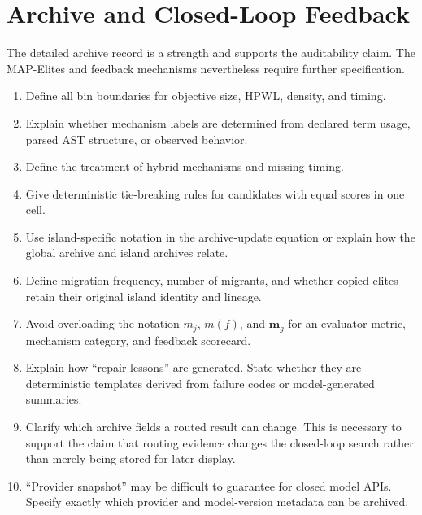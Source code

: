 \documentclass[11pt]{article}
\begin{document}
\section{Archive and Closed-Loop Feedback}

The detailed archive record is a strength and supports the auditability claim.
The MAP-Elites and feedback mechanisms nevertheless require further
specification.

\begin{enumerate}
  \item Define all bin boundaries for objective size, HPWL, density, and timing.

  \item Explain whether mechanism labels are determined from declared term
  usage, parsed AST structure, or observed behavior.

  \item Define the treatment of hybrid mechanisms and missing timing.

  \item Give deterministic tie-breaking rules for candidates with equal scores
  in one cell.

  \item Use island-specific notation in the archive-update equation or explain
  how the global archive and island archives relate.

  \item Define migration frequency, number of migrants, and whether copied
  elites retain their original island identity and lineage.

  \item Avoid overloading the notation $m_j$, $m(f)$, and $\mathbf m_g$ for an
  evaluator metric, mechanism category, and feedback scorecard.

  \item Explain how ``repair lessons'' are generated. State whether they are
  deterministic templates derived from failure codes or model-generated
  summaries.

  \item Clarify which archive fields a routed result can change. This is
  necessary to support the claim that routing evidence changes the closed-loop
  search rather than merely being stored for later display.

  \item ``Provider snapshot'' may be difficult to guarantee for closed model
  APIs. Specify exactly which provider and model-version metadata can be
  archived.
\end{enumerate}
\end{document}
